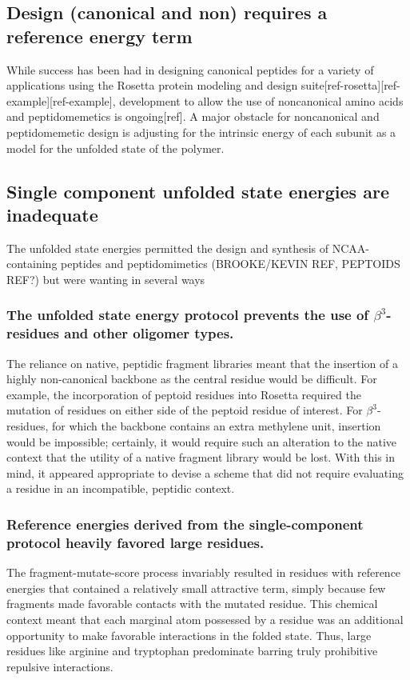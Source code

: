 \subsection{Design (canonical and non) requires a reference energy term}
While success has been had in designing canonical peptides for a variety of applications using the Rosetta protein modeling and design suite[ref-rosetta][ref-example][ref-example], development to allow the use of noncanonical amino acids and peptidomemetics is ongoing[ref]. A major obstacle for noncanonical and peptidomemetic design is adjusting for the intrinsic energy of each subunit as a model for the unfolded state of the polymer.


\subsection{Single component unfolded state energies are inadequate}
The unfolded state energies permitted the design and synthesis of NCAA-containing peptides and peptidomimetics (BROOKE/KEVIN REF, PEPTOIDS REF?) but were wanting in several ways
\subsubsection{The unfolded state energy protocol prevents the use of $\beta^3$-residues and other oligomer types.}
The reliance on native, peptidic fragment libraries meant that the insertion of a highly non-canonical backbone as the central residue would be difficult. 
For example, the incorporation of peptoid residues into Rosetta required the mutation of residues on either side of the peptoid residue of interest. 
For $\beta^3$-residues, for which the backbone contains an extra methylene unit, insertion would be impossible; certainly, it would require such an alteration to the native context that the utility of a native fragment library would be lost. 
With this in mind, it appeared appropriate to devise a scheme that did not require evaluating a residue in an incompatible, peptidic context. 
\subsubsection{Reference energies derived from the single-component protocol heavily favored large residues.}
The fragment-mutate-score process invariably resulted in residues with reference energies that contained a relatively small attractive term, simply because few fragments made favorable contacts with the mutated residue. This chemical context meant that each marginal atom possessed by a residue was an additional opportunity to make favorable interactions in the folded state. Thus, large residues like arginine and tryptophan predominate barring truly prohibitive repulsive interactions.
